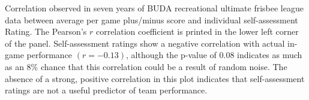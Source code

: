 Correlation observed in seven years of BUDA recreational ultimate frisbee league data between average per game plus/minus score and individual self-assessment Rating.  The Pearson's $r$ correlation coefficient is printed in the lower left corner of the panel. Self-assessment ratings show a negative correlation with actual in-game performance $(r = -0.13)$, although the p-value of 0.08 indicates as much as an 8\% chance that this correlation could be a result of random noise. The absence of a strong, positive correlation in this plot indicates that self-assessment ratings are not a useful predictor of team performance.